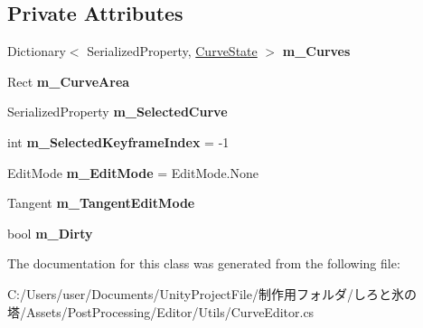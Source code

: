\subsection*{Private Attributes}
\begin{DoxyCompactItemize}
\item 
\mbox{\label{class_unity_editor_1_1_post_processing_1_1_curve_editor_a6ea254ff1a04210c2f0dc6d9371bc7bf}} 
Dictionary$<$ Serialized\+Property, \hyperlink{struct_unity_editor_1_1_post_processing_1_1_curve_editor_1_1_curve_state}{Curve\+State} $>$ {\bfseries m\+\_\+\+Curves}
\item 
\mbox{\label{class_unity_editor_1_1_post_processing_1_1_curve_editor_a75306519798e628fd89a316bcb1d6f4f}} 
Rect {\bfseries m\+\_\+\+Curve\+Area}
\item 
\mbox{\label{class_unity_editor_1_1_post_processing_1_1_curve_editor_a36de47c03952d15db6f5cff5dd504bde}} 
Serialized\+Property {\bfseries m\+\_\+\+Selected\+Curve}
\item 
\mbox{\label{class_unity_editor_1_1_post_processing_1_1_curve_editor_a876faf06602e8bd7370983eacd989a35}} 
int {\bfseries m\+\_\+\+Selected\+Keyframe\+Index} = -\/1
\item 
\mbox{\label{class_unity_editor_1_1_post_processing_1_1_curve_editor_a44705367f750cdc99eaa725ced2e2f94}} 
Edit\+Mode {\bfseries m\+\_\+\+Edit\+Mode} = Edit\+Mode.\+None
\item 
\mbox{\label{class_unity_editor_1_1_post_processing_1_1_curve_editor_a0bbe29444f0cbd8504e3d4d5baac9c8d}} 
Tangent {\bfseries m\+\_\+\+Tangent\+Edit\+Mode}
\item 
\mbox{\label{class_unity_editor_1_1_post_processing_1_1_curve_editor_ab3267da4470907f7f7889ceda0a6db94}} 
bool {\bfseries m\+\_\+\+Dirty}
\end{DoxyCompactItemize}


The documentation for this class was generated from the following file\+:\begin{DoxyCompactItemize}
\item 
C\+:/\+Users/user/\+Documents/\+Unity\+Project\+File/制作用フォルダ/しろと氷の塔/\+Assets/\+Post\+Processing/\+Editor/\+Utils/Curve\+Editor.\+cs\end{DoxyCompactItemize}
